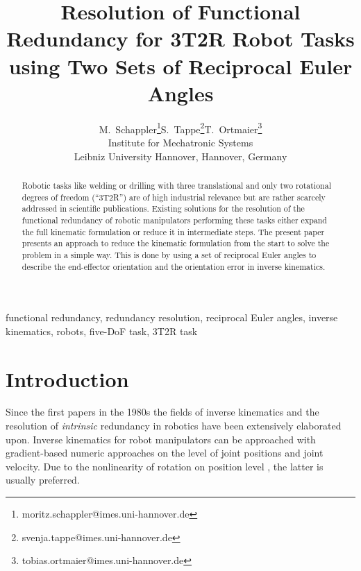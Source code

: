 \documentclass[twocolumn,10pt]{IFTOMM}
\begin{document}
\def\papernumber{IK xxx}
\def\conference_name{15th IFToMM World Congress, Krakow, Poland, 30 June--4 July, 2019}
\title{Resolution of Functional Redundancy for 3T2R Robot Tasks  \\ using Two Sets of Reciprocal Euler Angles}

\author{
    \begin{tabular}{cccc}
    M.\ Schappler\thanks{moritz.schappler@imes.uni-hannover.de}
& S.\ Tappe\thanks{svenja.tappe@imes.uni-hannover.de}
& T.\ Ortmaier\thanks{tobias.ortmaier@imes.uni-hannover.de}\\
    \multicolumn{3}{c}{Institute for Mechatronic Systems} \\
    \multicolumn{3}{c}{Leibniz University Hannover, Hannover, Germany}
    \end{tabular}
}

\maketitle

\begin{abstract}
Robotic tasks like welding or drilling with three translational and only two rotational degrees of freedom (``3T2R'') are of high industrial relevance but are ra\-ther scarcely addressed in scientific publications.
Existing solutions for the resolution of the functional redundancy of robotic manipulators performing these tasks either expand the full kinematic formulation or reduce it in intermediate steps.
The present paper presents an approach to reduce the kinematic formulation from the start to solve the problem in a simple way.
This is done by using a set of reciprocal Euler angles to describe the end-effector orientation and the orientation error in inverse kinematics.
\end{abstract}

\begin{keywords}
functional redundancy, redundancy resolution, reciprocal Euler angles, inverse kinematics, robots, five-DoF task, 3T2R task
\end{keywords}

\section{Introduction}
\label{sec:Intro}
Since the first papers in the 1980s the fields of inverse kinematics \cite{GoldenbergBenFen1985} and the resolution of \emph{intrinsic} redundancy \cite{Yoshikawa1984} in robotics have been extensively elaborated upon.
Inverse kinematics for robot manipulators can be approached with gradient-based numeric approaches on the level of joint positions and joint velocity.
Due to the nonlinearity of rotation on position level \cite{GoldenbergBenFen1985}, the latter is usually preferred.
\end{document}
